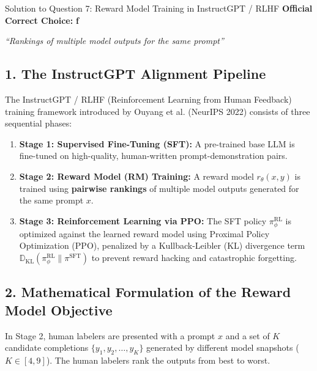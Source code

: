 \documentclass[11pt,a4paper]{article}
\begin{document}
\begin{solutionbox}{Solution to Question 7: Reward Model Training in InstructGPT / RLHF}
\textbf{Official Correct Choice:} \textbf{f}
\begin{center}
    \textit{``Rankings of multiple model outputs for the same prompt''}
\end{center}

\medskip
\subsection*{1. The InstructGPT Alignment Pipeline}
The InstructGPT / RLHF (Reinforcement Learning from Human Feedback) training framework introduced by Ouyang et al. (NeurIPS 2022) consists of three sequential phases:

\begin{tcolorbox}[colback=white,colframe=secondary,arc=2mm,title=\textbf{The Three Stages of InstructGPT / RLHF}]
\small
\begin{enumerate}[leftmargin=1.5em,itemsep=2pt]
    \item \textbf{Stage 1: Supervised Fine-Tuning (SFT):} A pre-trained base LLM is fine-tuned on high-quality, human-written prompt-demonstration pairs.
    \item \textbf{Stage 2: Reward Model (RM) Training:} A reward model $r_\theta(x, y)$ is trained using \textbf{pairwise rankings} of multiple model outputs generated for the same prompt $x$.
    \item \textbf{Stage 3: Reinforcement Learning via PPO:} The SFT policy $\pi_\phi^{\text{RL}}$ is optimized against the learned reward model using Proximal Policy Optimization (PPO), penalized by a Kullback-Leibler (KL) divergence term $\mathbb{D}_{\text{KL}}(\pi_\phi^{\text{RL}} \parallel \pi^{\text{SFT}})$ to prevent reward hacking and catastrophic forgetting.
\end{enumerate}
\end{tcolorbox}

\subsection*{2. Mathematical Formulation of the Reward Model Objective}
In Stage 2, human labelers are presented with a prompt $x$ and a set of $K$ candidate completions $\{y_1, y_2, \dots, y_K\}$ generated by different model snapshots ($K \in [4, 9]$). The human labelers rank the outputs from best to worst.


\end{solutionbox}
\end{document}
